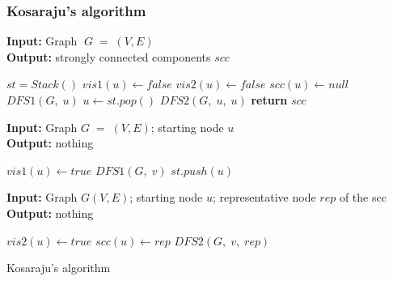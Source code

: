 \documentclass{article}
\begin{document}
\subsubsection{Kosaraju's algorithm}
\begin{algorithm}[ht]
\begin{minipage}[t]{0.48\textwidth}
\textbf{Input:} Graph $\;G\;=\;(V, E)$\\
\textbf{Output:} strongly connected components $scc$
\begin{algorithmic}[1]
    \State $st = Stack()$
            \State $vis1(u) \gets false$
            \State $vis2(u) \gets false$
            \State $scc(u) \gets null$
        \EndFor
                \State $DFS1(G,\; u)$
            \EndIf
        \EndFor
            \State $u\gets st.pop()$
                \State $DFS2(G,\;u,\;u)$
            \EndIf
        \EndWhile
    \State \textbf{return} $scc$
    \EndFunction
\end{algorithmic}
\end{minipage}
\hfill
\begin{minipage}[t]{0.51\textwidth}
\textbf{Input:} Graph $G\;=\;(V, E)$; starting node $u$\\
\textbf{Output:} nothing
\begin{algorithmic}[1]
        \State $vis1(u) \gets true$
            \State $DFS1(G,\; v)$
            \EndIf
        \EndFor
    \State $ st.push(u)$
    \EndFunction
\end{algorithmic}
\textbf{Input:} Graph $G(V, E)$; starting node $u$; representative node $rep$ of the scc \\
\textbf{Output:} nothing
\begin{algorithmic}[1]
        \State $vis2(u) \gets true$
        \State $scc(u) \gets rep$
                \State $DFS2(G,\; v,\; rep)$
            \EndIf
        \EndFor
    \EndFunction
\end{algorithmic}
\end{minipage}
\caption{Kosaraju's algorithm}
\end{algorithm}
\end{document}

